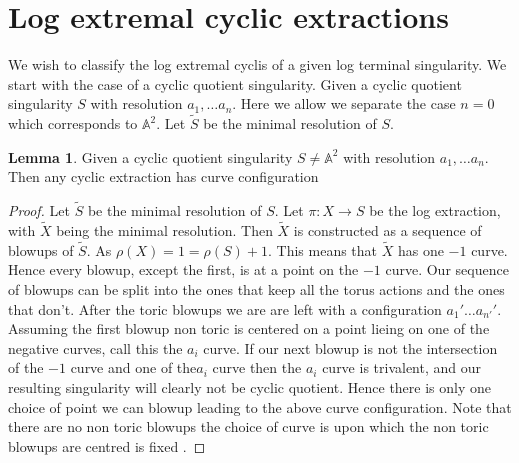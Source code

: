 \documentclass[11pt]{amsart}
\theoremstyle{definition}
\theoremstyle{definition}
\theoremstyle{definition}
\theoremstyle{definition}
\theoremstyle{definition}
\newtheorem{lem}[thm]{Lemma}
\theoremstyle{definition}
\theoremstyle{definition}
\theoremstyle{definition}
\begin{document}
 


\section{Log extremal cyclic extractions}

We wish to classify the log extremal cyclis of a given log terminal singularity. We start with the case of a cyclic quotient singularity. Given a cyclic quotient singularity $S$ with resolution $a_1, \dots a_n$. Here we allow we separate the case $n=0$ which corresponds to $\mathbb{A}^2$. Let $\widetilde{S}$ be the minimal resolution of $S$.

\begin{lem}
Given a cyclic quotient singularity $S \neq \mathbb{A}^2$ with resolution $a_1, \dots a_n$. Then any cyclic extraction has curve configuration 

\end{lem}

\begin{proof}
Let $\widetilde{S}$ be the minimal resolution of $S$. Let $\pi : X \rightarrow S$ be the log extraction, with $\widetilde{X}$ being the minimal resolution. Then $\widetilde{X}$ is constructed as a sequence of blowups of $\widetilde{S}$. As $\rho(X) = 1 = \rho(S) + 1$. This means that $\widetilde{X}$ has one $-1$ curve. Hence every blowup, except the first, is at a point on the $-1$ curve. Our sequence of blowups can be split into the ones that keep all the torus actions and the ones that don't. After the toric blowups we are are left with a configuration $a_1' \dots a_{n'}'$. Assuming the first blowup non toric is centered on a point  lieing on one of the negative curves, call this the $a_i$ curve. If our next blowup is not the intersection of the $-1$ curve and one of the$a_i$ curve then the $a_i$ curve is trivalent, and our resulting singularity will clearly not be cyclic quotient. Hence there is only one choice of point we can blowup leading to the above curve configuration. Note that there are no non toric blowups the choice of curve is  upon which the non toric blowups are centred is fixed .
\end{proof}
\end{document}
